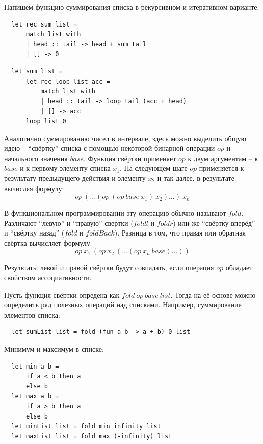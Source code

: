 \documentclass[a4paper,11pt]{article}
\begin{document}
Напишем функцию суммирования списка в рекурсивном и итеративном варианте:
\begin{lstlisting}
  let rec sum list =
      match list with
      | head :: tail -> head + sum tail
      | [] -> 0  
\end{lstlisting}

\begin{lstlisting}
  let sum list =
      let rec loop list acc =
          match list with
          | head :: tail -> loop tail (acc + head)
          | [] -> acc
      loop list 0
\end{lstlisting}

Аналогично суммированию чисел в интервале, здесь можно выделить общую идею -- 
``свёртку'' списка с помощью некоторой бинарной операции $op$ и начального 
значения $base$. Функция свёртки применяет $op$ к двум аргументам -- к $base$ и
к первому элементу списка $x_1$. На следующем шаге $op$ применяется к результату
предыдущего действия и элементу $x_2$ и так далее, в результате вычисляя формулу:
\begin{equation*}
  op~(\ldots (op~(op~base~x_1)~x_2) \ldots)~x_n
\end{equation*}

В функциональном программировании эту операцию обычно называют $fold$. Различают
``левую'' и ``правую'' свертки ($foldl$ и $foldr$) или же ``свёртку вперёд'' и
``свёртку назад'' ($fold$ и $foldBack$). Разница в том, что правая или обратная
свёртка вычисляет формулу
\begin{equation*}
  op~x_1~(op~x_2~(\ldots (op~x_n~base) \ldots))
\end{equation*}

Результаты левой и правой свёртки будут совпадать, если операция $op$ обладает
свойством ассоциативности.

Пусть функция свёртки опредена как $fold~op~base~list$. Тогда на её основе можно
определить ряд полезных операций над списками. Например, суммирование элементов
списка:
\begin{lstlisting}
  let sumList list = fold (fun a b -> a + b) 0 list
\end{lstlisting}

Минимум и максимум в списке:
\begin{lstlisting}
  let min a b = 
      if a < b then a
      else b
  let max a b = 
      if a > b then a
      else b
  let minList list = fold min infinity list
  let maxList list = fold max (-infinity) list
\end{lstlisting}
\end{document}

